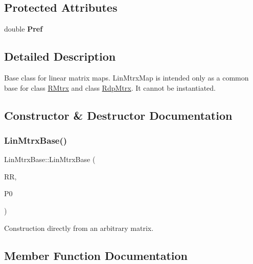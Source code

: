 \subsection*{Protected Attributes}
\begin{DoxyCompactItemize}
\item 
\mbox{\label{classLinMtrxBase_a690fa8a50d44fabb823542a3cfaa710f}} 
double {\bfseries Pref}
\end{DoxyCompactItemize}


\subsection{Detailed Description}
Base class for linear matrix maps. Lin\+Mtrx\+Map is intended only as a common base for class \hyperlink{classRMtrx}{R\+Mtrx} and class \hyperlink{classRdpMtrx}{Rdp\+Mtrx}. It cannot be instantiated. 

\subsection{Constructor \& Destructor Documentation}
\mbox{\label{classLinMtrxBase_a1fe32642d8171e69eed4de24951e6ccc}} 
\subsubsection{\texorpdfstring{Lin\+Mtrx\+Base()}{LinMtrxBase()}}
{\footnotesize\ttfamily Lin\+Mtrx\+Base\+::\+Lin\+Mtrx\+Base (\begin{DoxyParamCaption}\item[{const \hyperlink{classTLAS_1_1Matrix}{Real\+Matrix} \&}]{RR,  }\item[{double}]{P0 }\end{DoxyParamCaption})\hspace{0.3cm}{\ttfamily [protected]}}

Construction directly from an arbitrary matrix. 

\subsection{Member Function Documentation}
\mbox{\label{classLinMtrxBase_afc223d6f5ecc5f29900fc1826a52e06d}} 
